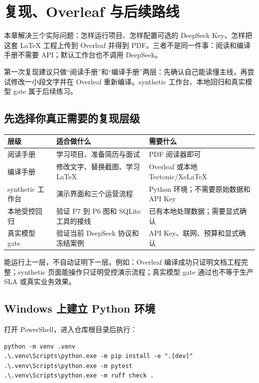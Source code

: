 \chapter{复现、Overleaf 与后续路线}

\begin{beginnerbox}
本章解决三个实际问题：怎样运行项目、怎样配置可选的 DeepSeek Key、怎样把这套 LaTeX 工程上传到 Overleaf 并得到 PDF。三者不是同一件事：阅读和编译手册不需要 API；默认工作台也不调用 DeepSeek。

第一次复现建议只做“阅读手册”和“编译手册”两层：先确认自己能读懂主线，再尝试修改一小段文字并在 Overleaf 重新编译。synthetic 工作台、本地回归和真实模型 gate 属于后续练习。
\end{beginnerbox}

\section{先选择你真正需要的复现层级}

\begin{longtable}{p{}p{}p{}}
\toprule
层级 & 适合做什么 & 需要什么 \\
\midrule
阅读手册 & 学习项目、准备简历与面试 & PDF 阅读器即可 \\
编译手册 & 修改文字、替换截图、学习 LaTeX & Overleaf 或本地 Tectonic/XeLaTeX \\
synthetic 工作台 & 演示界面和三个运营流程 & Python 环境；不需要原始数据和 API Key \\
本地受控回归 & 验证 P7 到 P6 图和 SQLite 工具的接线 & 已有本地处理数据；需要显式确认 \\
真实模型 gate & 验证当前 DeepSeek 协议和冻结案例 & API Key、联网、预算和显式确认 \\
\bottomrule
\end{longtable}

\begin{boundarybox}
能运行上一层，不自动证明下一层。例如：Overleaf 编译成功只证明文档工程完整；synthetic 页面能操作只证明受控演示流程；真实模型 gate 通过也不等于生产 SLA 或真实业务效果。
\end{boundarybox}

\section{Windows 上建立 Python 环境}

打开 PowerShell，进入仓库根目录后执行：

\begin{lstlisting}[language={}]
python -m venv .venv
.\.venv\Scripts\python.exe -m pip install -e ".[dev]"
.\.venv\Scripts\python.exe -m pytest
.\.venv\Scripts\python.exe -m ruff check .
\end{lstlisting}

